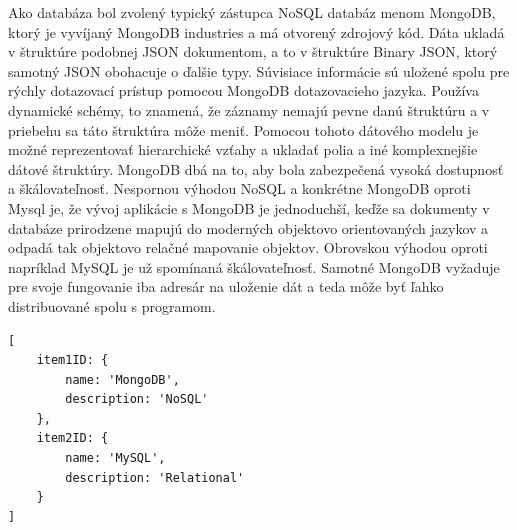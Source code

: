 Ako databáza bol zvolený typický zástupca NoSQL databáz menom MongoDB, ktorý je vyvíjaný MongoDB industries a má otvorený zdrojový kód. Dáta ukladá v štruktúre podobnej JSON dokumentom, a to v štruktúre Binary JSON, ktorý samotný JSON obohacuje o ďalšie typy. Súvisiace informácie sú uložené spolu pre rýchly dotazovací prístup pomocou MongoDB dotazovacieho jazyka. Používa dynamické schémy, to znamená, že záznamy nemajú pevne danú štruktúru a v priebehu sa táto štruktúra môže meniť. Pomocou tohoto dátového modelu je možné reprezentovať hierarchické vzťahy a ukladať polia a iné komplexnejšie dátové štruktúry. MongoDB dbá na to, aby bola zabezpečená vysoká dostupnosť a škálovateľnosť. Nespornou výhodou NoSQL a konkrétne MongoDB oproti Mysql je, že vývoj aplikácie s MongoDB je jednoduchší, keďže sa dokumenty v databáze prirodzene mapujú do moderných objektovo orientovaných jazykov a odpadá tak objektovo relačné mapovanie objektov. Obrovskou výhodou oproti napríklad MySQL je už spomínaná škálovateľnosť. Samotné MongoDB vyžaduje pre svoje fungovanie iba adresár na uloženie dát a teda môže byť ľahko distribuované spolu s programom. \cite{Banker2011}
\begin{lstlisting}[caption={Ukážka štruktúry NoSQL MongoDB databáze.},captionpos=b]
[
    item1ID: {
	    name: 'MongoDB',
	    description: 'NoSQL'
    },
    item2ID: {
	    name: 'MySQL',
	    description: 'Relational'
    }
]
\end{lstlisting}

